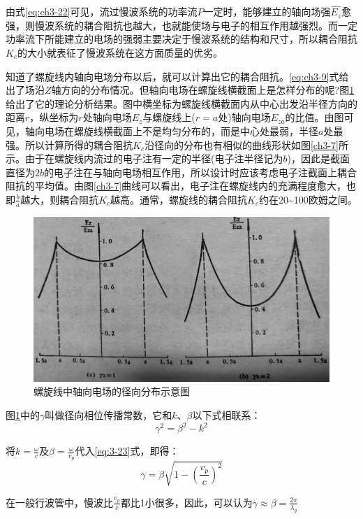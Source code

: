 由式\ref{eq:ch3-22}可见，流过慢波系统的功率流$ P $一定时，能够建立的轴向场强$ \hat{E_z} $愈强，则慢波系统的耦合阻抗也越大，也就能使场与电子的相互作用越强烈。而一定功率流下所能建立的电场的强弱主要决定于慢波系统的结构和尺寸，所以耦合阻抗$ K_c $的大小就表征了慢波系统在这方面质量的优劣。

知道了螺旋线内轴向电场分布以后，就可以计算出它的耦合阻抗。\ref{eq:ch3-9}式给出了场沿$ Z $轴方向的分布情况。但轴向电场在螺旋线横截面上是怎样分布的呢?图\ref{ch3-6}给出了它的理论分析结果。图中横坐标为螺旋线横截面内从中心出发沿半径方向的距离$ r $，纵坐标为$ r $处轴向电场$ E_z $与螺旋线上($ r=a $处)轴向电场$ E_{za} $的比值。由图可见，轴向电场在螺旋线横截面上不是均匀分布的，而是中心处最弱，半径$ a $处最强。所以计算所得的耦合阻抗$ K_c $沿径向的分布也有相似的曲线形状如图\ref{ch3-7}所示。由于在螺旋线内流过的电子注有一定的半径(电子注半径记为$ b $)，因此是截面直径为$ 2b $的电子注在与轴向电场相互作用，所以设计时应该考虑电子注截面上耦合阻抗的平均值。由图\ref{ch3-7}曲线可以看出，电子注在螺旋线内的充满程度愈大，也即$ \frac{b}{a} $越大，则耦合阻抗$ K_c $越高。通常，螺旋线的耦合阻抗$ K_c $约在20\textasciitilde100欧姆之间。

\begin{figure}[phtb]
	\centering
	\includegraphics[width=0.65\linewidth]{figure/ch3-6}
	\caption{螺旋线中轴向电场的径向分布示意图}
	\label{ch3-6}
\end{figure}

图\ref{ch3-6}中的$ \gamma $叫做径向相位传播常数，它和$ k $、$ \beta $以下式相联系：
\begin{equation} \label{eq:3-23}
	\gamma^2 = \beta^2 - k^2
\end{equation}

将$ k= \frac{\omega}{c} $及$ \beta = \frac{\omega}{v_p} $代入\eqref{eq:3-23}式，即得：
\begin{equation} \label{eq:3-24}
	\gamma = \beta\sqrt{1 - \left( \frac{v_p}{c} \right)^2}
\end{equation}

在一般行波管中，慢波比$ \frac{v_p}{c} $都比1小很多，因此，可以认为$ \gamma \approx \beta = \frac{2\pi}{\lambda_g} $

